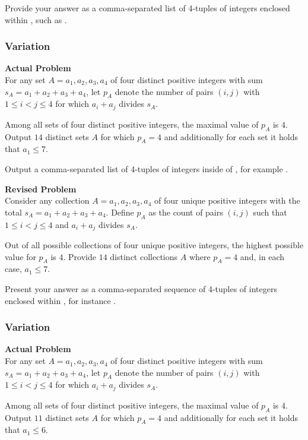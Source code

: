 Provide your answer as a comma-separated list of 4-tuples of integers enclosed within \boxed, such as .

\subsubsection{Variation}
\textbf{Actual Problem}\\
For any set $A = {a_1, a_2, a_3, a_4}$ of four distinct positive integers with sum $s_A = a_1 + a_2 + a_3 + a_4$,
let $p_A$ denote the number of pairs $(i, j)$ with $1 \leq i < j \leq 4$ for which $a_i + a_j$ divides $s_A$. 

Among all sets of four distinct positive integers, the maximal value of $p_A$ is $4$.
Output $14$ distinct sets $A$ for which $p_A=4$ and additionally for each set it holds that $a_1 \leq 7$. 


Output a comma-separated list of 4-tuples of integers inside of \boxed, for example .

\textbf{Revised Problem}\\
Consider any collection $A = {a_1, a_2, a_3, a_4}$ of four unique positive integers with the total $s_A = a_1 + a_2 + a_3 + a_4$. Define $p_A$ as the count of pairs $(i, j)$ such that $1 \leq i < j \leq 4$ and $a_i + a_j$ divides $s_A$.

Out of all possible collections of four unique positive integers, the highest possible value for $p_A$ is $4$. Provide $14$ distinct collections $A$ where $p_A=4$ and, in each case, $a_1 \leq 7$.

Present your answer as a comma-separated sequence of 4-tuples of integers enclosed within \boxed, for instance .

\subsubsection{Variation}
\textbf{Actual Problem}\\
For any set $A = {a_1, a_2, a_3, a_4}$ of four distinct positive integers with sum $s_A = a_1 + a_2 + a_3 + a_4$,
let $p_A$ denote the number of pairs $(i, j)$ with $1 \leq i < j \leq 4$ for which $a_i + a_j$ divides $s_A$. 

Among all sets of four distinct positive integers, the maximal value of $p_A$ is $4$.
Output $11$ distinct sets $A$ for which $p_A=4$ and additionally for each set it holds that $a_1 \leq 6$. 


